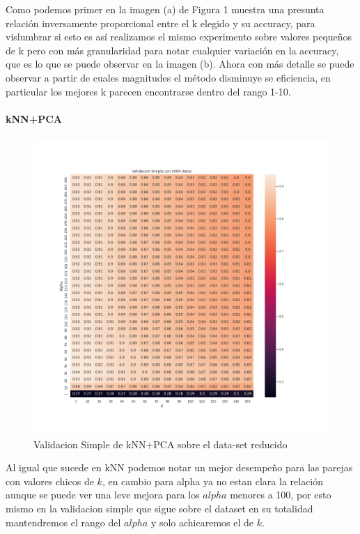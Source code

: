 \par

Como podemos primer en la imagen (a) de Figura 1 muestra una presunta relación inversamente proporcional entre el k elegido y su accuracy, para vislumbrar si esto es así realizamos el mismo experimento sobre valores pequeños de k pero con más granularidad para notar cualquier variación en la accuracy, que es lo que se puede observar en la imagen (b). Ahora con más detalle se puede observar a partir de cuales magnitudes el método disminuye se eficiencia, en particular los mejores k parecen encontrarse dentro del rango 1-10.

\paragraph{kNN+PCA}

\begin{figure}[H]
    \centering
    \includegraphics[width=12cm]{images/validacionSimple_heatmap_datasetRedux}%
    \qquad
    \caption{Validacion Simple de kNN+PCA sobre el data-set reducido}
    \label{knnpca_preliminar}%
\end{figure}

Al igual que sucede en kNN podemos notar un mejor desempeño para las parejas con valores chicos de $k$, en cambio para alpha ya no estan clara la relación aunque se puede ver una leve mejora para los $alpha$ menores a 100, por esto mismo en la validacion simple que sigue sobre el dataset en su totalidad mantendremos el rango del $alpha$ y solo achicaremos el de $k$.

